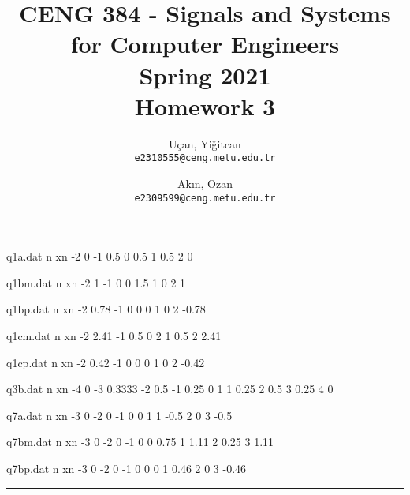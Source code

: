 \documentclass[10pt,a4paper, margin=1in]{article}
\author{
  Uçan, Yiğitcan\\
  \texttt{e2310555@ceng.metu.edu.tr}
  \and
  Akın, Ozan\\
  \texttt{e2309599@ceng.metu.edu.tr}
}
\title{CENG 384 - Signals and Systems for Computer Engineers \\
Spring 2021 \\
Homework 3}
\begin{document}
\maketitle


\begin{filecontents}{q1a.dat}
 n   xn
 -2  0
 -1  0.5
 0   0.5
 1   0.5 
 2   0
\end{filecontents}

\begin{filecontents}{q1bm.dat}
 n   xn
 -2  1
 -1  0
 0   1.5
 1   0 
 2   1
\end{filecontents}

\begin{filecontents}{q1bp.dat}
 n   xn
 -2  0.78
 -1  0
 0   0
 1   0 
 2   -0.78
\end{filecontents}


\begin{filecontents}{q1cm.dat}
 n   xn
 -2  2.41
 -1  0.5
 0   2
 1   0.5 
 2   2.41
\end{filecontents}


\begin{filecontents}{q1cp.dat}
 n   xn
 -2  0.42
 -1  0
 0   0
 1   0 
 2   -0.42
\end{filecontents}


\begin{filecontents}{q3b.dat}
 n   xn
 -4  0
 -3  0.3333
 -2  0.5
 -1  0.25
 0   1
 1   0.25 
 2   0.5
 3   0.25
 4   0
\end{filecontents}


\begin{filecontents}{q7a.dat}
 n   xn
 -3  0
 -2  0
 -1  0
 0   1
 1  -0.5
 2   0
 3   -0.5
\end{filecontents}


\begin{filecontents}{q7bm.dat}
 n   xn
 -3  0
 -2  0
 -1  0
 0   0.75
 1   1.11
 2   0.25
 3   1.11
\end{filecontents}


\begin{filecontents}{q7bp.dat}
 n   xn
 -3  0
 -2  0
 -1  0
 0   0
 1   0.46
 2   0
 3   -0.46
\end{filecontents}



\noindent\rule{19cm}{1.2pt}
\end{document}
